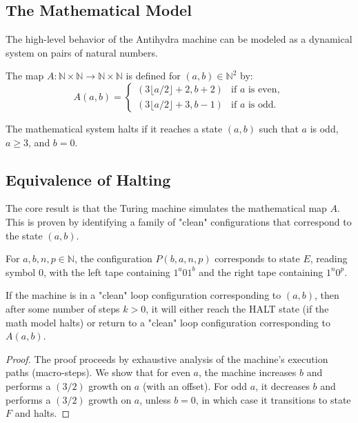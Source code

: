 \subsection{The Mathematical Model}

The high-level behavior of the Antihydra machine can be modeled as a dynamical system on pairs of natural numbers.

\begin{definition}
  \label{def:A_map}
  \leanok
  The map $A: \mathbb{N} \times \mathbb{N} \to \mathbb{N} \times \mathbb{N}$ is defined for $(a, b) \in \mathbb{N}^2$ by:
  \[
  A(a, b) = \begin{cases}
    (3 \lfloor a/2 \rfloor + 2, b + 2) & \text{if } a \text{ is even}, \\
    (3 \lfloor a/2 \rfloor + 3, b - 1) & \text{if } a \text{ is odd}.
  \end{cases}
  \]
\end{definition}

\begin{definition}
  \label{def:mathHaltingCondition}
  \leanok
  The mathematical system halts if it reaches a state $(a, b)$ such that $a$ is odd, $a \ge 3$, and $b = 0$.
\end{definition}

\subsection{Equivalence of Halting}

The core result is that the Turing machine simulates the mathematical map $A$. This is proven by identifying a family of "clean" configurations that correspond to the state $(a, b)$.

\begin{definition}
  \label{def:P_Config_Pad}
  \leanok
  For $a, b, n, p \in \mathbb{N}$, the configuration $P(b, a, n, p)$ corresponds to state $E$, reading symbol 0, with the left tape containing $1^a 0 1^b$ and the right tape containing $1^n 0^p$.
\end{definition}

\begin{theorem}
  \label{thm:tm_simulates_math}
  \leanok
  If the machine is in a "clean" loop configuration corresponding to $(a, b)$, then after some number of steps $k > 0$, it will either reach the HALT state (if the math model halts) or return to a "clean" loop configuration corresponding to $A(a, b)$.
  \begin{proof}
    \leanok
    The proof proceeds by exhaustive analysis of the machine's execution paths (macro-steps). We show that for even $a$, the machine increases $b$ and performs a $(3/2)$ growth on $a$ (with an offset). For odd $a$, it decreases $b$ and performs a $(3/2)$ growth on $a$, unless $b=0$, in which case it transitions to state $F$ and halts.
  \end{proof}
\end{theorem}

